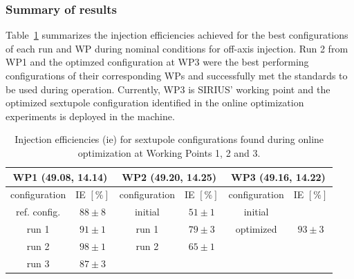 \subsubsection{Summary of results}
Table~\ref{tb:summary} summarizes the injection efficiencies achieved for the best configurations of each run and WP during nominal conditions for off-axis injection. Run 2 from \gls*{WP1} and the optimzed configuration at \gls*{WP3} were the best performing configurations of their corresponding WPs and successfully met the standards to be used during operation. Currently, \gls*{WP3} is SIRIUS' working point and the optimized sextupole configuration identified in the online optimization experiments is deployed in the machine.
\begin{table}[htb]
    \centering
    \caption{Injection efficiencies (\gls*{ie}) for sextupole configurations found during online optimization at Working Points 1, 2 and 3.}
    \begin{tabular}{cccccc}
    \hline
    \multicolumn{2}{c}{\gls*{WP1} (49.08, 14.14)} & \multicolumn{2}{c}{\gls*{WP2} (49.20, 14.25)}         & \multicolumn{2}{c}{\gls*{WP3} (49.16, 14.22)}         \\ \hline
    configuration      & IE $[\%]$      & configuration        & IE $[\%]$            & configuration        & IE $[\%]$            \\ \hline
    ref. config.       & $88\pm8$       & initial              & $51\pm1$             & initial              &                      \\
    run 1              & $91\pm1$       & run 1                & $79\pm3$             & optimized            & $93\pm3$             \\
    run 2              & $98\pm1$       & run 2                & $65\pm1    $         &                      &                      \\
    run 3              & $87\pm3$       & \multicolumn{1}{l}{} & \multicolumn{1}{l}{} & \multicolumn{1}{l}{} & \multicolumn{1}{l}{} \\ \hline
    \end{tabular}
    \label{tb:summary}
    \end{table}
